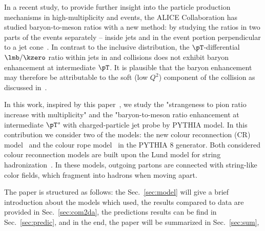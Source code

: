 \documentclass[ALICE,manyauthors]{StrinJet}
\begin{document}
In a recent study, to provide further insight into the particle production mechanisms in high-multiplicity \pp and \pPb events,
the ALICE Collaboration has studied baryon-to-meson ratios with a new method: by studying the ratios in two parts of the events separately -- inside jets and in the event portion perpendicular to a jet cone~\cite{ALICE:2021cvd}. 
In contrast to the inclusive distribution, the $\pT$-differential $\lmb/\kzero$ ratio within jets in \pp and \pPb collisions does not exhibit baryon enhancement at intermediate $\pT$.
It is plausible that the baryon enhancement may therefore be attributable to the soft (low $Q^{2}$) component of the collision as discussed in~\cite{Cuautle:2014yda}.

In this work, inspired by this paper~\cite{ALICE:2021cvd}, we study the "strangeness to pion ratio increase with multiplicity" and the "baryon-to-meson ratio enhancement at intermediate $\pT$" with charged-particle jet probe by PYTHIA model. 
In this contribution we consider two of the models: the new colour reconnection (CR) model~\cite{Christiansen:2015yqa, Sjostrand:2014zea} and the colour rope model~\cite{Biro:1984cf, Bierlich:2014xba, Flensburg:2011kk} in the PYTHIA 8 generator.
Both considered colour reconnection models are built upon the Lund model for string hadronization~\cite{Andersson:1983ia, Buckley:2011ms}.  In these models, outgoing partons are connected with string-like color fields, which fragment into hadrons when moving apart.

The paper is structured as follows: the Sec.~\ref{sec:model} will give a brief introduction about the models which used, the results compared to data are provided in Sec.~\ref{sec:com2da}, the predictions results can be find in Sec.~\ref{sec:predic}, and in the end, the paper will be summarized in Sec.~\ref{sec:sum},


\end{document}
